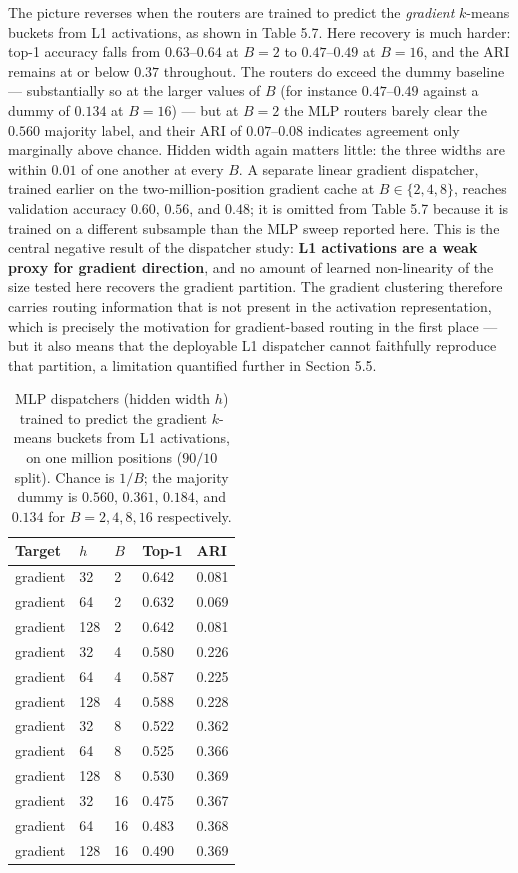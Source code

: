 The picture reverses when the routers are trained to predict the \emph{gradient} $k$-means buckets from L1 activations, as shown in Table 5.7. Here recovery is much harder: top-1 accuracy falls from $0.63$--$0.64$ at $B=2$ to $0.47$--$0.49$ at $B=16$, and the ARI remains at or below $0.37$ throughout. The routers do exceed the dummy baseline --- substantially so at the larger values of $B$ (for instance $0.47$--$0.49$ against a dummy of $0.134$ at $B=16$) --- but at $B=2$ the MLP routers barely clear the $0.560$ majority label, and their ARI of $0.07$--$0.08$ indicates agreement only marginally above chance. Hidden width again matters little: the three widths are within $0.01$ of one another at every $B$. A separate linear gradient dispatcher, trained earlier on the two-million-position gradient cache at $B \in \{2,4,8\}$, reaches validation accuracy $0.60$, $0.56$, and $0.48$; it is omitted from Table 5.7 because it is trained on a different subsample than the MLP sweep reported here. This is the central negative result of the dispatcher study: \textbf{L1 activations are a weak proxy for gradient direction}, and no amount of learned non-linearity of the size tested here recovers the gradient partition. The gradient clustering therefore carries routing information that is not present in the activation representation, which is precisely the motivation for gradient-based routing in the first place --- but it also means that the deployable L1 dispatcher cannot faithfully reproduce that partition, a limitation quantified further in Section 5.5.


\begin{table}[H]
\centering
\caption{MLP dispatchers (hidden width $h$) trained to predict the gradient $k$-means buckets from L1 activations, on one million positions ($90/10$ split). Chance is $1/B$; the majority dummy is $0.560$, $0.361$, $0.184$, and $0.134$ for $B=2,4,8,16$ respectively.}
\small
\begin{tabular}{lllll}
\toprule
Target & $h$ & $B$ & Top-1 & ARI \\
\midrule
gradient & 32 & 2 & 0.642 & 0.081 \\
gradient & 64 & 2 & 0.632 & 0.069 \\
gradient & 128 & 2 & 0.642 & 0.081 \\
gradient & 32 & 4 & 0.580 & 0.226 \\
gradient & 64 & 4 & 0.587 & 0.225 \\
gradient & 128 & 4 & 0.588 & 0.228 \\
gradient & 32 & 8 & 0.522 & 0.362 \\
gradient & 64 & 8 & 0.525 & 0.366 \\
gradient & 128 & 8 & 0.530 & 0.369 \\
gradient & 32 & 16 & 0.475 & 0.367 \\
gradient & 64 & 16 & 0.483 & 0.368 \\
gradient & 128 & 16 & 0.490 & 0.369 \\
\bottomrule
\end{tabular}
\end{table}



